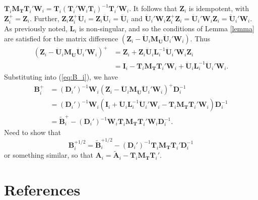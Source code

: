 \documentclass[12pt]{article}
\begin{document}
\(\mathbf{T}_i \mathbf{M_T} \mathbf{T}_i' \mathbf{W}_i = \mathbf{T}_i \left(\mathbf{T}_i' \mathbf{W}_i\mathbf{T}_i\right)^{-1} \mathbf{T}_i' \mathbf{W}_i\).
It follows that \(\mathbf{Z}_i\) is idempotent, with
\(\mathbf{Z}_i^+ = \mathbf{Z}_i\). Further,
\(\mathbf{Z}_i \mathbf{Z}_i^+ \mathbf{\ddot{U}}_i = \mathbf{Z}_i \mathbf{\ddot{U}}_i = \mathbf{\ddot{U}}_i\)
and
\(\mathbf{\ddot{U}}_i' \mathbf{W}_i \mathbf{Z}_i^+ \mathbf{Z}_i = \mathbf{\ddot{U}}_i' \mathbf{W}_i \mathbf{Z}_i = \mathbf{\ddot{U}}_i' \mathbf{W}_i\).
As previously noted, \(\mathbf{L}_i\) is non-singular, and so the
conditions of Lemma \ref{lemma} are satisfied for the matrix difference
\((\mathbf{Z}_i - \mathbf{\ddot{U}}_i \mathbf{M_{\ddot{U}}}\mathbf{\ddot{U}}_i'\mathbf{W}_i)\).
Thus \begin{align*}
(\mathbf{Z}_i - \mathbf{\ddot{U}}_i \mathbf{M_{\ddot{U}}}\mathbf{\ddot{U}}_i'\mathbf{W}_i)^+ &= \mathbf{Z}_i + \mathbf{Z}_i \mathbf{\ddot{U}}_i \mathbf{L}_i^{-1} \mathbf{\ddot{U}}_i' \mathbf{W}_i \mathbf{Z}_i \\
&= \mathbf{I}_i - \mathbf{T}_i \mathbf{M_T}\mathbf{T}_i'\mathbf{W}_i + \mathbf{\ddot{U}}_i \mathbf{L}_i^{-1} \mathbf{\ddot{U}}_i' \mathbf{W}_i.
\end{align*} Substituting into (\ref{eq:B_i}), we have \begin{align}
\mathbf{B}_i^+ &= \left(\mathbf{D}_i'\right)^{-1} \mathbf{W}_i \left(\mathbf{Z}_i - \mathbf{\ddot{U}}_i \mathbf{M_{\ddot{U}}}\mathbf{\ddot{U}}_i'\mathbf{W}_i \right)^+ \mathbf{D}_i^{-1} \nonumber \\
&= \left(\mathbf{D}_i'\right)^{-1} \mathbf{W}_i \left(\mathbf{I}_i + \mathbf{\ddot{U}}_i \mathbf{L}_i^{-1} \mathbf{\ddot{U}}_i' \mathbf{W}_i  - \mathbf{T}_i \mathbf{M_T}\mathbf{T}_i'\mathbf{W}_i\right) \mathbf{D}_i^{-1} \nonumber \\
&= \tilde{\mathbf{B}}_i^+ - \left(\mathbf{D}_i'\right)^{-1} \mathbf{W}_i \mathbf{T}_i \mathbf{M_T}\mathbf{T}_i'\mathbf{W}_i \mathbf{D}_i^{-1}.
\end{align} Need to show that \[
\mathbf{B}_i^{+1/2} = \tilde{\mathbf{B}}_i^{+1/2} - \left(\mathbf{D}_i'\right)^{-1} \mathbf{T}_i \mathbf{M_T}\mathbf{T}_i'\mathbf{D}_i^{-1}
\] or something similar, so that
\(\mathbf{A}_i = \tilde{\mathbf{A}}_i - \mathbf{T}_i \mathbf{M_T}\mathbf{T}_i'\).

\hypertarget{references}{%
\section*{References}\label{references}}
\end{document}
